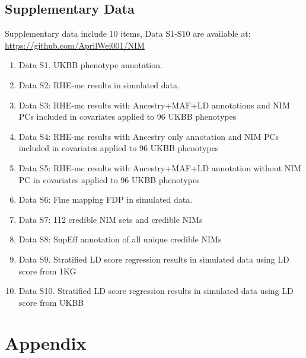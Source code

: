 \subsection{Supplementary Data}
Supplementary data include 10 items, Data S1-S10 are available at:\\ \href{https://github.com/AprilWei001/NIM}{https://github.com/AprilWei001/NIM}
\begin{enumerate}
    \item Data S1. UKBB phenotype annotation. 
    \item Data S2: RHE-mc results in simulated data. 
    \item Data S3: RHE-mc results with Ancestry+MAF+LD annotations and NIM PCs included in covariates applied to 96 UKBB phenotypes
    \item Data S4: RHE-mc results with Ancestry only annotation and NIM PCs included in covariates applied to 96 UKBB phenotypes
    \item Data S5: RHE-mc results with Ancestry+MAF+LD annotation without NIM PC in covariates applied to 96 UKBB phenotypes
    \item Data S6: Fine mapping FDP in simulated data. 
    \item Data S7: 112 credible NIM sets and credible NIMs
    \item Data S8: SnpEff annotation of all unique credible NIMs
    \item Data S9. Stratified LD score regression results in simulated data using LD score from 1KG
    \item Data S10. Stratified LD score regression results in simulated data using LD score from UKBB
\end{enumerate}
\section{Appendix}
